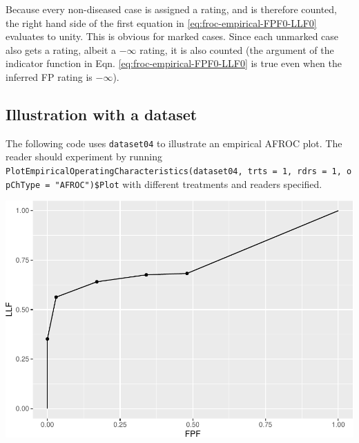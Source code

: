 \documentclass[
]{book}
\newenvironment{Shaded}{\begin{snugshade}}{\end{snugshade}}
\newcommand{\AttributeTok}[1]{\textcolor[rgb]{0.77,0.63,0.00}{#1}}
\newcommand{\DecValTok}[1]{\textcolor[rgb]{0.00,0.00,0.81}{#1}}
\newcommand{\FunctionTok}[1]{\textcolor[rgb]{0.00,0.00,0.00}{#1}}
\newcommand{\NormalTok}[1]{#1}
\newcommand{\OtherTok}[1]{\textcolor[rgb]{0.56,0.35,0.01}{#1}}
\newcommand{\SpecialCharTok}[1]{\textcolor[rgb]{0.00,0.00,0.00}{#1}}
\newcommand{\StringTok}[1]{\textcolor[rgb]{0.31,0.60,0.02}{#1}}
\begin{document}
Because every non-diseased case is assigned a rating, and is therefore counted, the right hand side of the first equation in \eqref{eq:froc-empirical-FPF0-LLF0} evaluates to unity. This is obvious for marked cases. Since each unmarked case also gets a rating, albeit a \(-\infty\) rating, it is also counted (the argument of the indicator function in Eqn. \eqref{eq:froc-empirical-FPF0-LLF0} is true even when the inferred FP rating is \(-\infty\)).

\hypertarget{froc-empirical-afroc-plot-illustration}{%
\subsection{Illustration with a dataset}\label{froc-empirical-afroc-plot-illustration}}

The following code uses \texttt{dataset04} to illustrate an empirical AFROC plot. The reader should experiment by running \texttt{PlotEmpiricalOperatingCharacteristics(dataset04,\ trts\ =\ 1,\ rdrs\ =\ 1,\ opChType\ =\ "AFROC")\$Plot} with different treatments and readers specified.

\begin{Shaded}
\end{Shaded}

\includegraphics{13a-froc-empirical1_files/figure-latex/unnamed-chunk-7-1.pdf}
\end{document}
